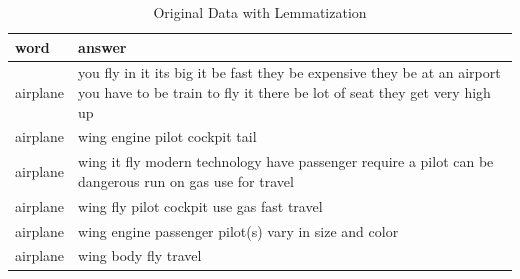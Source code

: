 \documentclass[man]{apa6}
\newenvironment{Shaded}{\begin{snugshade}}{\end{snugshade}}
\newcommand{\CharTok}[1]{\textcolor[rgb]{0.31,0.60,0.02}{#1}}
\newcommand{\CommentTok}[1]{\textcolor[rgb]{0.56,0.35,0.01}{\textit{#1}}}
\newcommand{\DataTypeTok}[1]{\textcolor[rgb]{0.13,0.29,0.53}{#1}}
\newcommand{\KeywordTok}[1]{\textcolor[rgb]{0.13,0.29,0.53}{\textbf{#1}}}
\newcommand{\NormalTok}[1]{#1}
\newcommand{\OperatorTok}[1]{\textcolor[rgb]{0.81,0.36,0.00}{\textbf{#1}}}
\newcommand{\OtherTok}[1]{\textcolor[rgb]{0.56,0.35,0.01}{#1}}
\newcommand{\StringTok}[1]{\textcolor[rgb]{0.31,0.60,0.02}{#1}}
\begin{document}
\scriptsize

\begin{Shaded}
\end{Shaded}

\normalsize

\begin{table}[t]

\caption{\label{tab:tab3}Original Data with Lemmatization}
\centering
\begin{tabular}{l>{\raggedright\arraybackslash}p{30em}}
\toprule
word & answer\\
\midrule
airplane & you fly in it  its big  it be fast  they be expensive  they be at an airport  you have to be train to fly it  there be lot of seat  they get very high up\\
airplane & wing engine pilot cockpit tail\\
airplane & wing  it fly  modern technology  have passenger  require a pilot  can be dangerous  run on gas  use for travel\\
airplane & wing  fly  pilot  cockpit  use gas  fast travel\\
airplane & wing  engine  passenger  pilot(s)  vary in size and color\\
\addlinespace
airplane & wing  body  fly  travel\\
\bottomrule
\end{tabular}
\end{table}
\end{document}
